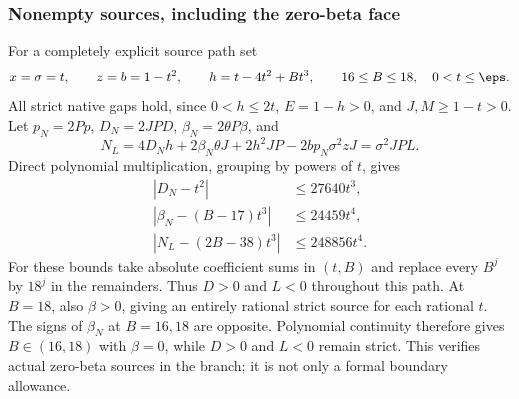 \subsubsection*{Nonempty sources, including the zero-beta face}
For a completely explicit source path set
\[
 x=\sigma=t,\qquad z=b=1-t^2,\qquad
 h=t-4t^2+Bt^3,\qquad 16\le B\le18,\quad0<t\le\eps.
\]
All strict native gaps hold, since $0<h\le2t$, $E=1-h>0$,
and $J,M\ge1-t>0$. Let $p_N=2Pp$, $D_N=2JPD$,
$\beta_N=2\theta P\beta$, and
\[
 N_L=4D_Nh+2\beta_N\theta J+2h^2JP
                              -2bp_N\sigma^2zJ=\sigma^2JP L.
\]
Direct polynomial multiplication, grouping by powers of $t$, gives
\[
\begin{split}
 |D_N-t^2|&\le27640t^3,\\
 |\beta_N-(B-17)t^3|&\le24459t^4,\\
 |N_L-(2B-38)t^3|&\le248856t^4.
\end{split}
\]
For these bounds take absolute coefficient sums in $(t,B)$ and
replace every $B^j$ by $18^j$ in the remainders. Thus $D>0$ and
$L<0$ throughout this path. At $B=18$, also $\beta>0$, giving
an entirely rational strict source for each rational $t$.
The signs of $\beta_N$ at $B=16,18$ are opposite. Polynomial
continuity therefore gives $B\in(16,18)$ with $\beta=0$, while
$D>0$ and $L<0$ remain strict. This verifies actual zero-beta
sources in the branch; it is not only a formal boundary allowance.
